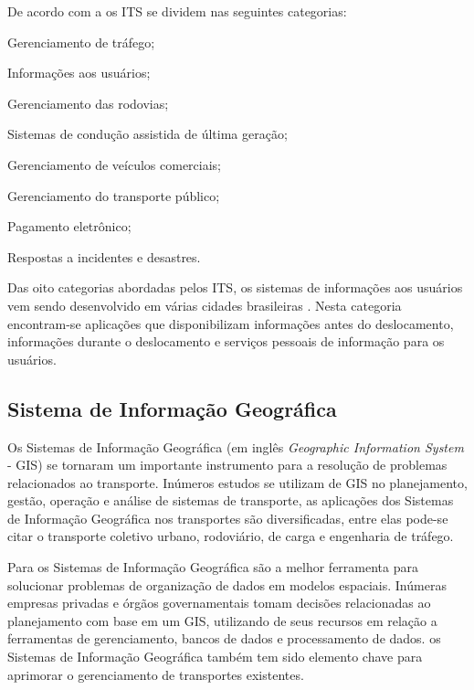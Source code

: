 De acordo com a  os ITS se dividem nas seguintes categorias:

\begin{lista}
\item Gerenciamento de tráfego;
\item Informações aos usuários;
\item Gerenciamento das rodovias;
\item Sistemas de condução assistida de última geração;
\item Gerenciamento de veículos comerciais;
\item Gerenciamento do transporte público;
\item Pagamento eletrônico;
\item Respostas a incidentes e desastres.
\end{lista}

Das oito categorias abordadas pelos ITS, os sistemas de informações aos usuários vem sendo desenvolvido em várias cidades brasileiras \cite{revista_opara}. Nesta categoria encontram-se aplicações que disponibilizam informações antes do deslocamento, informações durante o deslocamento e serviços pessoais de informação para os usuários.

\subsection{Sistema de Informação Geográfica}

Os Sistemas de Informação Geográfica (em inglês \textit{Geographic Information System} - GIS) se tornaram um importante instrumento para a resolução de problemas relacionados ao transporte. Inúmeros estudos se utilizam de GIS no planejamento, gestão, operação e análise de sistemas de transporte, as aplicações dos Sistemas de Informação Geográfica nos transportes são diversificadas, entre elas pode-se citar o transporte coletivo urbano, rodoviário, de carga e engenharia de tráfego. \cite{dantas}

Para  os Sistemas de Informação Geográfica são a melhor ferramenta para solucionar problemas de organização de dados em modelos espaciais. Inúmeras empresas privadas e órgãos governamentais tomam decisões relacionadas ao planejamento com base em um GIS, utilizando de seus recursos em relação a ferramentas de gerenciamento, bancos de dados e processamento de dados. os Sistemas de Informação Geográfica também tem sido elemento chave para aprimorar o gerenciamento de transportes existentes.

